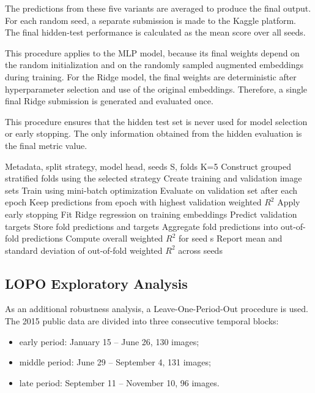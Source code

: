 The predictions from these five variants are averaged to produce the final output. For each random seed, a separate submission is made to the Kaggle platform. The final hidden-test performance is calculated as the mean score over all seeds.

This procedure applies to the MLP model, because its final weights depend on the random initialization and on the randomly sampled augmented embeddings during training. For the Ridge model, the final weights are deterministic after hyperparameter selection and use of the original embeddings. Therefore, a single final Ridge submission is generated and evaluated once.

This procedure ensures that the hidden test set is never used for model selection or early stopping. The only information obtained from the hidden evaluation is the final metric value.

\begin{algorithm}[ht] 
\caption{Grouped cross-validation evaluation protocol} 
\begin{algorithmic}[1] 
\Require Metadata, split strategy, model head, seeds S, folds K=5 
\State Construct grouped stratified folds using the selected strategy 
\State Create training and validation image sets 
\State Train using mini-batch optimization 
\State Evaluate on validation set after each epoch 
\State Keep predictions from epoch with highest validation weighted $R^2$ 
\State Apply early stopping 
\Else 
\State Fit Ridge regression on training embeddings 
\State Predict validation targets 
\EndIf 
\State Store fold predictions and targets 
\EndFor 
\State Aggregate fold predictions into out-of-fold predictions 
\State Compute overall weighted $R^2$ for seed s 
\EndFor 
\State Report mean and standard deviation of out-of-fold weighted $R^2$ across seeds \end{algorithmic} 
\end{algorithm}

\subsection{LOPO Exploratory Analysis}

As an additional robustness analysis, a Leave-One-Period-Out procedure is used. The 2015 public data are divided into three consecutive temporal blocks:

\begin{itemize}
    \item early period: January 15 -- June 26, 130 images;
    \item middle period: June 29 -- September 4, 131 images;
    \item late period: September 11 -- November 10, 96 images.
\end{itemize}

